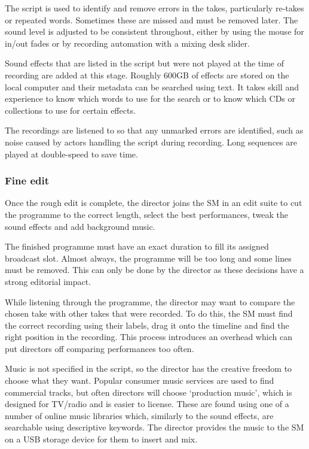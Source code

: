 The script is used to identify and remove errors in the takes, particularly
re-takes or repeated words. Sometimes these are missed and must be removed
later. The sound level is adjusted to be consistent throughout, either by using
the mouse for in/out fades or by recording automation with a mixing desk
slider.

Sound effects that are listed in the script but were not played at the time of
recording are added at this stage. Roughly 600GB of effects are stored on the
local computer and their metadata can be searched using text. It takes skill
and experience to know which words to use for the search or to know which CDs
or collections to use for certain effects.

The recordings are listened to so that any unmarked errors are identified, such
as noise caused by actors handling the script during recording. Long sequences
are played at double-speed to save time.

\subsubsection{Fine edit}\label{sec:drama-fine}
Once the rough edit is complete, the director joins the SM in an edit suite to
cut the programme to the correct length, select the best performances, tweak
the sound effects and add background music.

The finished programme must have an exact duration to fill its assigned
broadcast slot. Almost always, the programme will be too long and some lines
must be removed. This can only be done by the director as these decisions have
a strong editorial impact.

While listening through the programme, the director may want to compare the
chosen take with other takes that were recorded. To do this, the SM must find
the correct recording using their labels, drag it onto the timeline and find
the right position in the recording. This process introduces an overhead which
can put directors off comparing performances too often.

Music is not specified in the script, so the director has the creative freedom
to choose what they want. Popular consumer music services are used to find
commercial tracks, but often directors will choose `production music', which is
designed for TV/radio and is easier to license. These are found using one of a
number of online music libraries which, similarly to the sound effects, are
searchable using descriptive keywords. The director provides the music to the
SM on a USB storage device for them to insert and mix.

